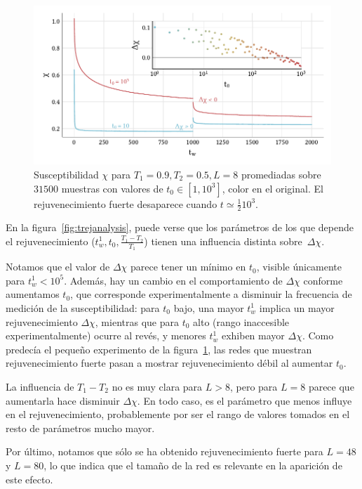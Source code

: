 \documentclass[11pt]{report}
\begin{document}
\begin{figure}
  \centering
  \includegraphics{../study_cases/vanishingrejuvenation/trej.pdf}
  \caption{Susceptibilidad $χ$ para $T_1=0.9, T_2=0.5, L=8$
    promediadas sobre $31500$ muestras con valores de $t_0∈[1,10^3]$,
    color en el original. El rejuvenecimiento fuerte desaparece cuando
    $t ≃ \frac{1}{2} 10^3$.}
  \label{fig:vanishing}
\end{figure}


En la figura~\ref{fig:trejanalysis}, puede verse que los parámetros de
los que depende el rejuvenecimiento ($t_w^1, t_0,
\frac{T_1-T_2}{T_1}$) tienen una influencia distinta sobre~$Δχ$.

Notamos que el valor de $Δχ$ parece tener un mínimo en $t_0$, visible
únicamente para $t_w^1<10^5$. Además, hay un cambio en el
comportamiento de $Δχ$ conforme aumentamos $t_0$, que corresponde
experimentalmente a disminuir la frecuencia de medición de la
susceptibilidad: para $t_0$ bajo, una mayor $t_w^1$ implica un mayor
rejuvenecimiento $Δχ$, mientras que para $t_0$ alto (rango inaccesible
experimentalmente) ocurre al revés, y menores $t_w^1$ exhiben mayor
$Δχ$. Como predecía el pequeño experimento de la
figura~\ref{fig:vanishing}, las redes que muestran rejuvenecimiento
fuerte pasan a mostrar rejuvenecimiento débil al aumentar $t_0$.

La influencia de $T_1-T_2$ no es muy clara para $L>8$, pero para $L=8$
parece que aumentarla hace disminuir $Δχ$. En todo caso, es el
parámetro que menos influye en el rejuvenecimiento, probablemente por
ser el rango de valores tomados en el resto de parámetros mucho mayor.

Por último, notamos que sólo se ha obtenido rejuvenecimiento fuerte
para $L=48$ y $L=80$, lo que indica que el tamaño de la red es
relevante en la aparición de este efecto.
\end{document}

